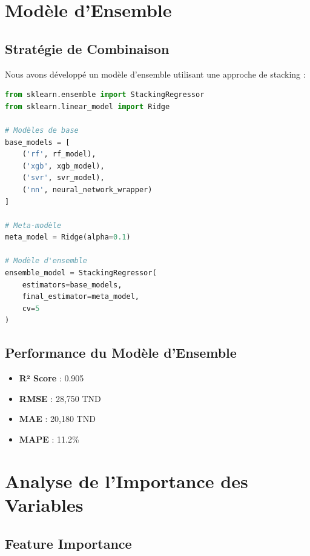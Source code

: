 \section{Modèle d'Ensemble}

\subsection{Stratégie de Combinaison}

Nous avons développé un modèle d'ensemble utilisant une approche de stacking :

\begin{lstlisting}[language=Python, caption=Modèle d'ensemble par stacking]
from sklearn.ensemble import StackingRegressor
from sklearn.linear_model import Ridge

# Modèles de base
base_models = [
    ('rf', rf_model),
    ('xgb', xgb_model),
    ('svr', svr_model),
    ('nn', neural_network_wrapper)
]

# Meta-modèle
meta_model = Ridge(alpha=0.1)

# Modèle d'ensemble
ensemble_model = StackingRegressor(
    estimators=base_models,
    final_estimator=meta_model,
    cv=5
)
\end{lstlisting}

\subsection{Performance du Modèle d'Ensemble}

\begin{itemize}
    \item \textbf{R² Score} : 0.905
    \item \textbf{RMSE} : 28,750 TND
    \item \textbf{MAE} : 20,180 TND
    \item \textbf{MAPE} : 11.2\%
\end{itemize}

\section{Analyse de l'Importance des Variables}

\subsection{Feature Importance}

